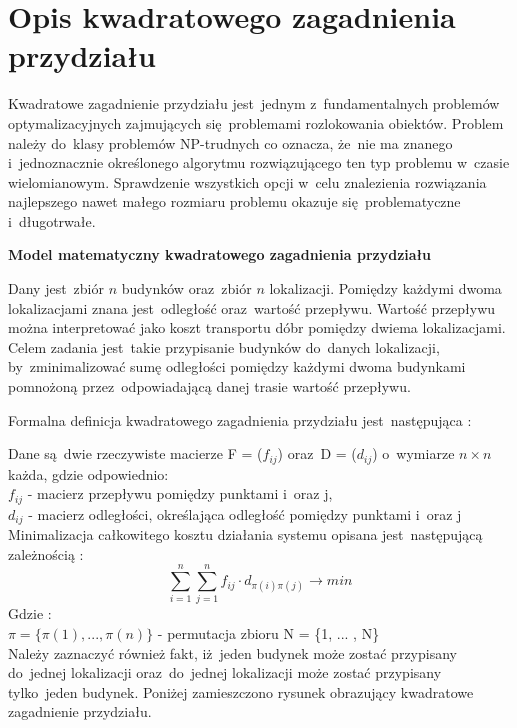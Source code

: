
\section{Opis kwadratowego zagadnienia przydziału}\label{sec:strukturaDokumentu}

Kwadratowe zagadnienie przydziału jest~jednym z~fundamentalnych problemów optymalizacyjnych zajmujących się~problemami rozlokowania obiektów. Problem należy do~klasy problemów NP-trudnych co oznacza, że~nie ma znanego i~jednoznacznie określonego algorytmu rozwiązującego ten typ problemu w~czasie wielomianowym. Sprawdzenie wszystkich opcji w~celu znalezienia rozwiązania najlepszego nawet małego rozmiaru problemu okazuje się~problematyczne i~długotrwałe.\\
\par
\textbf{Model matematyczny kwadratowego zagadnienia przydziału}\\
\par
Dany jest~zbiór $n$ budynków oraz~zbiór $n$ lokalizacji. Pomiędzy każdymi dwoma lokalizacjami znana jest~odległość oraz~wartość przepływu. Wartość przepływu można interpretować jako koszt transportu dóbr pomiędzy dwiema lokalizacjami. Celem zadania jest~takie przypisanie budynków do~danych lokalizacji, by~zminimalizować sumę odległości pomiędzy każdymi dwoma budynkami pomnożoną przez~odpowiadającą danej trasie wartość przepływu.


Formalna definicja kwadratowego zagadnienia przydziału jest~następująca \cite{chmiel} :

Dane są~dwie rzeczywiste macierze F = ($f_{ij}$) oraz~D = ($d_{ij}$) o~wymiarze $ n \times n $ każda, gdzie odpowiednio:\\
$f_{ij}$ - macierz przepływu pomiędzy punktami i~oraz j,\\
$d_{ij}$ - macierz odległości, określająca odległość pomiędzy punktami i~oraz j
Minimalizacja całkowitego kosztu działania systemu opisana jest~następującą zależnością :
\begin{equation}
\label {mathmodel}
\sum_{i=1}^{n}\sum_{j=1}^{n}f_{ij} \cdot d_{\pi(i)\pi(j)} \longrightarrow min
\end{equation}
Gdzie :\\
$\pi = \{\pi(1), ... , \pi(n)\}$ - permutacja zbioru N = \{1, ... , N\}\\
Należy zaznaczyć również fakt, iż~jeden budynek może zostać przypisany do~jednej lokalizacji oraz~do~jednej lokalizacji może zostać  przypisany tylko~jeden budynek. Poniżej zamieszczono rysunek obrazujący kwadratowe zagadnienie przydziału.

